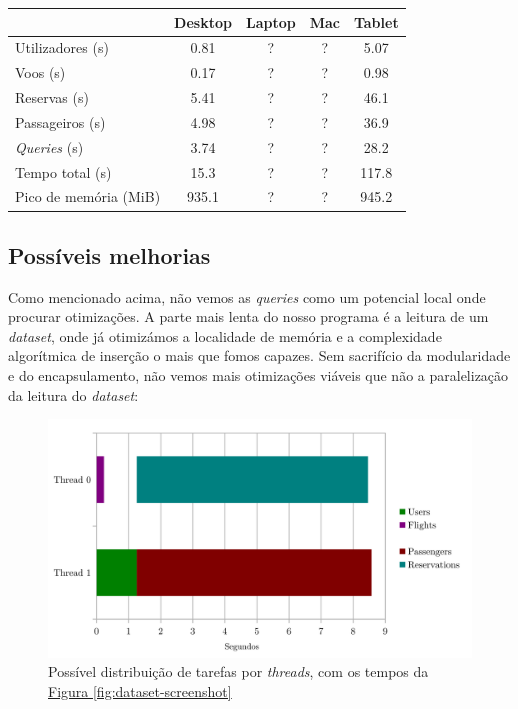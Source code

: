 \documentclass[11pt, a4paper]{article}
\begin{document}
\begin{center}
    \begin{tabular}{|l|c|c|c|c|}
        \hline
        & Desktop & Laptop & Mac & Tablet \\
        \hline
        Utilizadores (s) & 0.81 & ? & ? & 5.07 \\
        \hline
        Voos (s) & 0.17 & ? & ? & 0.98 \\
        \hline
        Reservas (s) & 5.41 & ? & ? & 46.1 \\
        \hline
        Passageiros (s) & 4.98 & ? & ? & 36.9 \\
        \hline
        \emph{Queries} (s) & 3.74 & ? & ? & 28.2 \\
        \hline
        Tempo total (s) & 15.3 & ? & ? & 117.8 \\
        \hline
        Pico de memória (MiB) & 935.1 & ? & ? & 945.2 \\
        \hline
    \end{tabular}
\end{center}


\subsection{Possíveis melhorias}
\label{sec:possible-performance-improvements}

Como mencionado acima, não vemos as \emph{queries} como um potencial local onde procurar
otimizações. A parte mais lenta do nosso programa é a leitura de um \emph{dataset}, onde já
otimizámos a localidade de memória e a complexidade algorítmica de inserção o mais que fomos
capazes. Sem sacrifício da modularidade e do encapsulamento, não vemos mais otimizações viáveis
que não a paralelização da leitura do \emph{dataset}:

\begin{figure}[h]
    \centering
    \includegraphics[scale=0.20]{res-fase2/threading.png}
    \caption{Possível distribuição de tarefas por \emph{threads}, com os tempos da
             \hyperref[fig:dataset-screenshot]{Figura \ref*{fig:dataset-screenshot}}}
    \label{fig:threading}
\end{figure}
\end{document}
